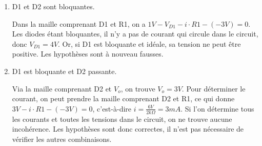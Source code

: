 \documentclass{../../template/tp}
\begin{document}
{\begin{enumerate}
    \item D1 et D2 sont bloquantes.

    Dans la maille comprenant D1 et R1, on a $1V - V_{D1} - i \cdot R1 - (-3V) = 0$.
    Les diodes étant bloquantes, il n'y a pas de courant qui circule dans le circuit, donc $V_{D1} = 4V$.
    Or, si D1 est bloquante et idéale, sa tension ne peut être positive.
    Les hypothèses sont à nouveau fausses.

    \item D1 est bloquante et D2 passante.

    Via la maille comprenant D2 et $V_o$, on trouve $V_o = 3V$.
    Pour déterminer le courant, on peut prendre la maille comprenant D2 et R1, ce qui donne $3V - i \cdot R1 - (-3V) = 0$, c'est-à-dire $i = \frac{6V}{2k\Omega} = 3mA$.
    Si l'on détermine tous les courants et toutes les tensions dans le circuit, on ne trouve aucune incohérence.
    Les hypothèses sont donc correctes, il n'est pas nécessaire de vérifier les autres combinaisons.
\end{enumerate}
}
\end{document}

